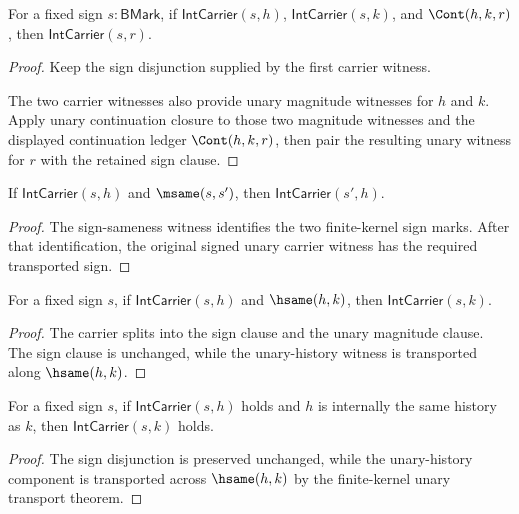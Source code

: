 \begin{theorem}
\label{thm:int-carrier-continuation-closed-same-sign}
For a fixed sign $s:\mathsf{BMark}$, if $\mathsf{IntCarrier}(s,h)$, $\mathsf{IntCarrier}(s,k)$, and $\Cont(h,k,r)$, then $\mathsf{IntCarrier}(s,r)$.
\end{theorem}
\begin{proof}
Keep the sign disjunction supplied by the first carrier witness.

The two carrier witnesses also provide unary magnitude witnesses for $h$ and $k$. Apply unary continuation closure to those two magnitude witnesses and the displayed continuation ledger $\Cont(h,k,r)$, then pair the resulting unary witness for $r$ with the retained sign clause.
\end{proof}

\begin{theorem}
\label{thm:int-carrier-sign-msame-transport}
If \(\mathsf{IntCarrier}(s,h)\) and \(\msame(s,s')\), then
\(\mathsf{IntCarrier}(s',h)\).
\end{theorem}
\begin{proof}
The sign-sameness witness identifies the two finite-kernel sign marks. After
that identification, the original signed unary carrier witness has the required
transported sign.
\end{proof}

\begin{theorem}
\label{thm:int-carrier-transport-hsame-magnitude}
For a fixed sign \(s\), if \(\mathsf{IntCarrier}(s,h)\) and \(\hsame(h,k)\), then \(\mathsf{IntCarrier}(s,k)\).
\end{theorem}
\begin{proof}
The carrier splits into the sign clause and the unary magnitude clause. The sign clause is unchanged, while the unary-history witness is transported along \(\hsame(h,k)\).
\end{proof}

\begin{theorem}
\label{prop:intup-magnitude-hsame-transport}
For a fixed sign \(s\), if \(\mathsf{IntCarrier}(s,h)\) holds and \(h\) is internally the same history as \(k\), then \(\mathsf{IntCarrier}(s,k)\) holds.
\end{theorem}
\begin{proof}
The sign disjunction is preserved unchanged, while the unary-history component is transported across \(\hsame(h,k)\) by the finite-kernel unary transport theorem.
\end{proof}

